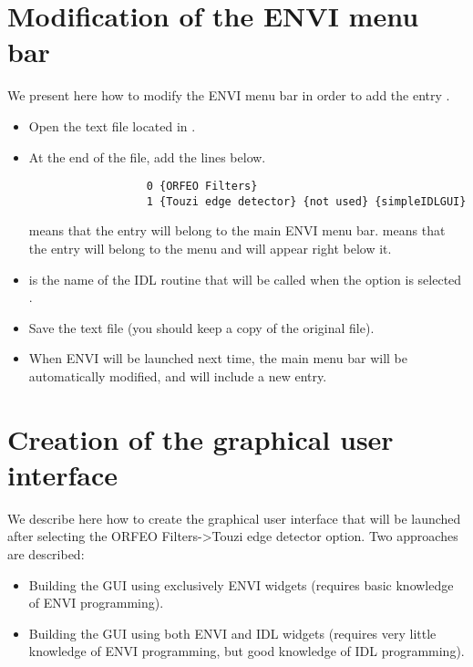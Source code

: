 \section{Modification of the ENVI menu bar} 

We present here how to modify the ENVI menu bar in order to add the entry .
\begin{itemize}
    \item Open the text file  located in .
    \item At the end of the file, add the lines below.
        \begin{verbatim}
                  0 {ORFEO Filters}
                  1 {Touzi edge detector} {not used} {simpleIDLGUI}
        \end{verbatim}
         means that the entry    will belong to the main ENVI menu bar. 
         means that the entry   will belong to the menu    and will appear right below it.
    \item  {} is the name of the IDL routine that will be called when the option  is selected .
    \item Save the  text file (you should keep a copy of the original file).
    \item When ENVI will be launched next time, the main menu bar will be automatically modified, and will include a new  entry.
\end{itemize}


\section{Creation of the graphical user interface}
We describe here how to create the graphical user interface that will be launched after selecting the  ORFEO Filters->Touzi edge detector  option. Two approaches are described:
 \begin{itemize}
    \item Building the GUI using exclusively ENVI widgets (requires basic knowledge of ENVI programming).
    \item Building the GUI using both ENVI and IDL widgets (requires very little knowledge of ENVI programming, 
        but good knowledge of IDL programming).
\end{itemize}

